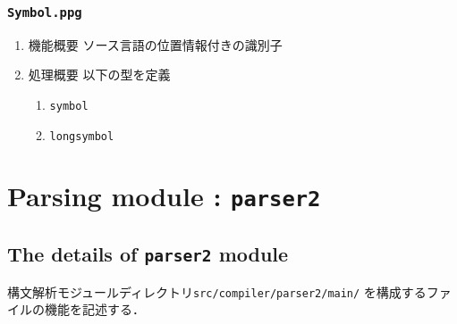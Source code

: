 \documentclass{jbook}
\newif\ifjp
\newcommand{\txt}[2]{#2}
\newcommand{\code}[1]{\mbox{\large\tt #1}}
\begin{document}
\subsection{\code{Symbol.ppg}}
\begin{enumerate}
\item 機能概要 ソース言語の位置情報付きの識別子
\item 処理概要 
以下の型を定義
\begin{enumerate}
\item \code{symbol}
\item \code{longsymbol}
\end{enumerate}
\end{enumerate}
\else%
\fi%


% 
\chapter{\txt
{構文解析モジュール：\code{parser2}}
{Parsing module : \code{parser2}}
}
\label{chap:parsing}
\ifjp%
\begin{enumerate}
\item ソースロケーション \code{src/compiler/parser2/main}以下のファイル
\item 機能概要
	構文解析処理
\item 処理概要
以下のデータと処理を定義
\begin{enumerate}
\item ソース言語の構文解析のための文法と語彙の定義
\item インターフェイス言語の構文解析のための文法の定義
\item ソース言語のパーザの定義
\item インタフェイス言語のパーザの定義
\end{enumerate}
\end{enumerate}
\else%
\fi%


\section{\txt{\code{parser2}モジュールの処理の詳細}{The details of \code{parser2} module}}
\ifjp%
	構文解析モジュールディレクトリ\code{src/compiler/parser2/main/}
を構成するファイルの機能を記述する．
\end{document}
